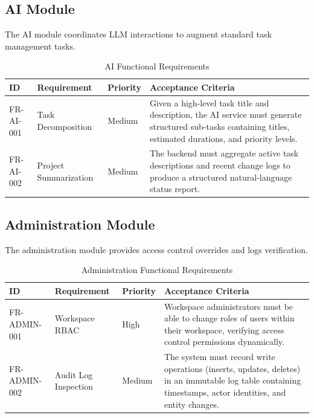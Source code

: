 \subsection{AI Module}
The AI module coordinates LLM interactions to augment standard task management tasks.

\begin{table}[h!]
\centering
\small
\renewcommand{\arraystretch}{1.5}
\begin{tabularx}{\textwidth}{l p{2.2cm} l X}
    \toprule[1.5pt]
    \rowcolor{primary!5}
    \textbf{\color{primary}ID} & \textbf{\color{primary}Requirement} & \textbf{\color{primary}Priority} & \textbf{\color{primary}Acceptance Criteria} \\
    \midrule
    FR-AI-001 & Task Decomposition & Medium & Given a high-level task title and description, the AI service must generate structured sub-tasks containing titles, estimated durations, and priority levels. \\
    FR-AI-002 & Project Summarization & Medium & The backend must aggregate active task descriptions and recent change logs to produce a structured natural-language status report. \\
    \bottomrule[1.5pt]
\end{tabularx}
\caption{AI Functional Requirements}
\label{tab:fr_ai}
\end{table}

\subsection{Administration Module}
The administration module provides access control overrides and logs verification.

\begin{table}[h!]
\centering
\small
\renewcommand{\arraystretch}{1.5}
\begin{tabularx}{\textwidth}{l p{2.2cm} l X}
    \toprule[1.5pt]
    \rowcolor{primary!5}
    \textbf{\color{primary}ID} & \textbf{\color{primary}Requirement} & \textbf{\color{primary}Priority} & \textbf{\color{primary}Acceptance Criteria} \\
    \midrule
    FR-ADMIN-001 & Workspace RBAC & High & Workspace administrators must be able to change roles of users within their workspace, verifying access control permissions dynamically. \\
    FR-ADMIN-002 & Audit Log Inspection & Medium & The system must record write operations (inserts, updates, deletes) in an immutable log table containing timestamps, actor identities, and entity changes. \\
    \bottomrule[1.5pt]
\end{tabularx}
\caption{Administration Functional Requirements}
\label{tab:fr_admin}
\end{table}

